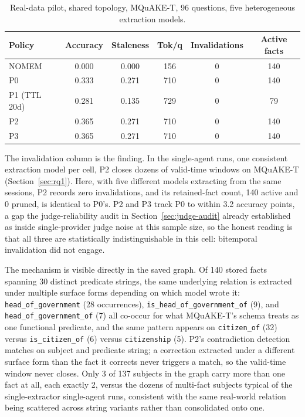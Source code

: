 \begin{table}[H]
\centering
\caption{Real-data pilot, shared topology, MQuAKE-T, 96 questions, five heterogeneous extraction models.}
\label{tab:rq4-pilot}
\small
\begin{tabular}{lccccc}
\toprule
Policy & Accuracy & Staleness & Tok/q & Invalidations & Active facts \\
\midrule
NOMEM & 0.000 & 0.000 & 156 & 0 & 140 \\
P0 & 0.333 & 0.271 & 710 & 0 & 140 \\
P1 (TTL 20d) & 0.281 & 0.135 & 729 & 0 & 79 \\
P2 & 0.365 & 0.271 & 710 & 0 & 140 \\
P3 & 0.365 & 0.271 & 710 & 0 & 140 \\
\bottomrule
\end{tabular}
\end{table}

The invalidation column is the finding. In the single-agent runs, one consistent extraction model per cell, P2 closes dozens of valid-time windows on MQuAKE-T (Section~\ref{sec:rq1}). Here, with five different models extracting from the same sessions, P2 records zero invalidations, and its retained-fact count, 140 active and 0 pruned, is identical to P0's. P2 and P3 track P0 to within 3.2 accuracy points, a gap the judge-reliability audit in Section~\ref{sec:judge-audit} already established as inside single-provider judge noise at this sample size, so the honest reading is that all three are statistically indistinguishable in this cell: bitemporal invalidation did not engage.

The mechanism is visible directly in the saved graph. Of 140 stored facts spanning 30 distinct predicate strings, the same underlying relation is extracted under multiple surface forms depending on which model wrote it: \texttt{head\_of\_government} (28 occurrences), \texttt{is\_head\_of\_government\_of} (9), and \texttt{head\_of\_government\_of} (7) all co-occur for what MQuAKE-T's schema treats as one functional predicate, and the same pattern appears on \texttt{citizen\_of} (32) versus \texttt{is\_citizen\_of} (6) versus \texttt{citizenship} (5). P2's contradiction detection matches on subject and predicate string; a correction extracted under a different surface form than the fact it corrects never triggers a match, so the valid-time window never closes. Only 3 of 137 subjects in the graph carry more than one fact at all, each exactly 2, versus the dozens of multi-fact subjects typical of the single-extractor single-agent runs, consistent with the same real-world relation being scattered across string variants rather than consolidated onto one.

